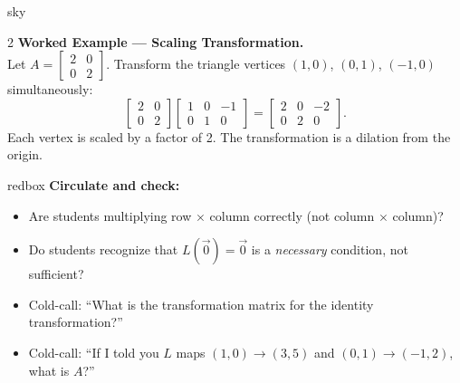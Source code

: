 \documentclass[10pt]{article}
\begin{document}
\begin{skillbox}[Lesson]{sky}
\begin{multicols}{2}
\vspace{6pt}
\textbf{Worked Example --- Scaling Transformation.}\\
Let $A = \begin{bmatrix}2&0\\0&2\end{bmatrix}$.  Transform the triangle vertices
$(1,0)$, $(0,1)$, $(-1,0)$ simultaneously:
\[
  \begin{bmatrix}2&0\\0&2\end{bmatrix}
  \begin{bmatrix}1&0&-1\\0&1&0\end{bmatrix}
  = \begin{bmatrix}2&0&-2\\0&2&0\end{bmatrix}.
\]
Each vertex is scaled by a factor of 2.  The transformation is a dilation from the origin.

\end{multicols}
\end{skillbox}

\begin{skillbox}{redbox}
    \textbf{Circulate and check:}
    \begin{itemize}[leftmargin=1.2em, itemsep=2pt]
        \item Are students multiplying row $\times$ column correctly (not column $\times$ column)?
        \item Do students recognize that $L(\vec{0})=\vec{0}$ is a \emph{necessary} condition,
              not sufficient?
        \item Cold-call: ``What is the transformation matrix for the identity transformation?''
        \item Cold-call: ``If I told you $L$ maps $(1,0)\to(3,5)$ and $(0,1)\to(-1,2)$,
              what is $A$?''
    \end{itemize}
\end{skillbox}
\end{document}
